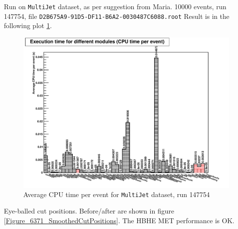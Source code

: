 

Run on \texttt{MultiJet} dataset, as per suggestion from Maria.
10000 events, run 147754, file \texttt{D2B675A9-91D5-DF11-B6A2-0030487C6088.root}
Result is in the following plot \ref{Figure_6371_MultiJetExecutionTime}.

\begin{figure}[htbp]
   \includegraphics[width=120mm]{DailyLog/6371/6371_MultiJetExecutionTime}
   \caption{Average CPU time per event for \texttt{MultiJet} dataset, run 147754}
   \label{Figure_6371_MultiJetExecutionTime}
\end{figure}


Eye-balled cut positions.  Before/after are shown in figure \ref{Figure_6371_SmoothedCutPositions}.  The HBHE MET performance is OK.

